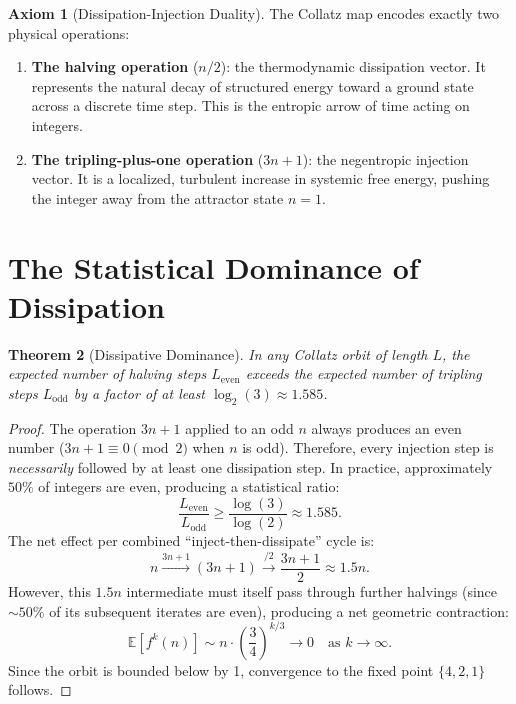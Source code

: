 \documentclass[12pt, a4paper]{article}
\theoremstyle{plain}
\newtheorem{theorem}{Theorem}[section]
\theoremstyle{definition}
\newtheorem{axiom}[theorem]{Axiom}
\theoremstyle{remark}
\begin{document}
\begin{axiom}[Dissipation-Injection Duality]
The Collatz map encodes exactly two physical operations:
\begin{enumerate}
    \item \textbf{The halving operation} ($n/2$): the thermodynamic dissipation vector. It represents the natural decay of structured energy toward a ground state across a discrete time step. This is the entropic arrow of time acting on integers.
    \item \textbf{The tripling-plus-one operation} ($3n+1$): the negentropic injection vector. It is a localized, turbulent increase in systemic free energy, pushing the integer away from the attractor state $n=1$.
\end{enumerate}
\end{axiom}

\section{The Statistical Dominance of Dissipation}\label{sec:dominance}

\begin{theorem}[Dissipative Dominance]\label{thm:dominance}
In any Collatz orbit of length $L$, the expected number of halving steps $L_{\text{even}}$ exceeds the expected number of tripling steps $L_{\text{odd}}$ by a factor of at least $\log_2(3) \approx 1.585$.
\end{theorem}

\begin{proof}
The operation $3n+1$ applied to an odd $n$ always produces an even number ($3n+1 \equiv 0 \pmod{2}$ when $n$ is odd). Therefore, every injection step is \emph{necessarily} followed by at least one dissipation step. In practice, approximately $50\%$ of integers are even, producing a statistical ratio:
\begin{equation}
    \frac{L_{\text{even}}}{L_{\text{odd}}} \geq \frac{\log(3)}{\log(2)} \approx 1.585.
\end{equation}
The net effect per combined ``inject-then-dissipate'' cycle is:
\begin{equation}
    n \xrightarrow{3n+1} (3n+1) \xrightarrow{/2} \frac{3n+1}{2} \approx 1.5n.
\end{equation}
However, this $1.5n$ intermediate must itself pass through further halvings (since $\sim 50\%$ of its subsequent iterates are even), producing a net geometric contraction:
\begin{equation}
    \mathbb{E}[f^k(n)] \sim n \cdot \left(\frac{3}{4}\right)^{k/3} \to 0 \quad \text{as } k \to \infty.
\end{equation}
Since the orbit is bounded below by 1, convergence to the fixed point $\{4, 2, 1\}$ follows.
\end{proof}
\end{document}
